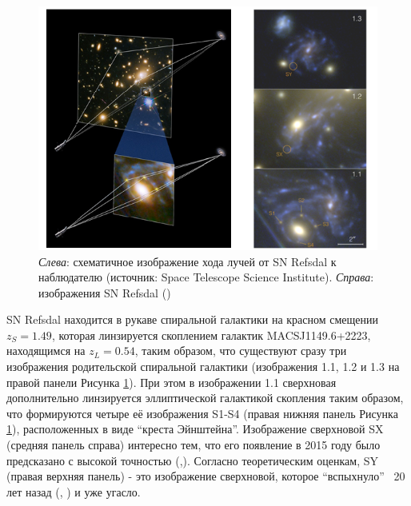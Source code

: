 \begin{figure}[h!]
    \centering
	\includegraphics[scale=0.74]{pics/snrefsdal.png}
	\caption{\textit{Слева}: схематичное изображение хода лучей от SN Refsdal к  наблюдателю (источник: Space Telescope Science Institute). \textit{Справа}: изображения SN Refsdal (\cite{treu2015}) \label{fig:snrefsdalfig}}
\end{figure}

SN Refsdal находится в рукаве спиральной галактики на красном смещении $z_S= 1.49$, которая линзируется скоплением галактик MACSJ1149.6+2223, находящимся на $z_L= 0.54$, таким образом, что существуют сразу три изображения родительской спиральной галактики (изображения 1.1, 1.2 и 1.3 на правой панели Рисунка \ref{fig:snrefsdalfig}). При этом в изображении 1.1 сверхновая дополнительно линзируется эллиптической галактикой скопления таким образом, что формируются четыре её изображения S1-S4 (правая нижняя панель Рисунка \ref{fig:snrefsdalfig}), расположенных в виде “креста Эйнштейна”. Изображение сверхновой SX (средняя панель справа) интересно тем, что его появление в 2015 году было предсказано с высокой точностью (\cite{kelly2014},\cite{treu2015}). Согласно теоретическим оценкам, SY (правая верхняя панель) - это изображение сверхновой, которое “вспыхнуло” ~20 лет назад (\cite{kelly2014}, \cite{treu2015}) и уже угасло.
